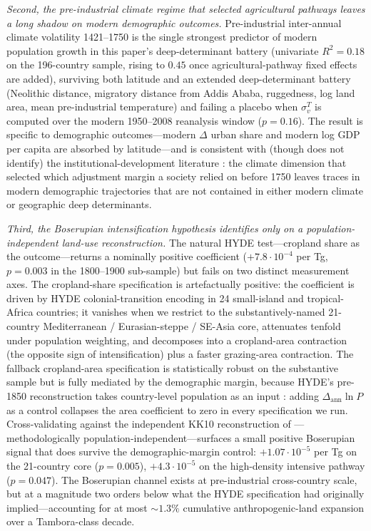 \documentclass[11pt,letterpaper]{article}
\begin{document}
\emph{Second, the pre-industrial climate regime that selected agricultural pathways leaves a long shadow on modern demographic outcomes.} Pre-industrial inter-annual climate volatility 1421--1750 is the single strongest predictor of modern population growth in this paper's deep-determinant battery (univariate $R^2 = 0.18$ on the 196-country sample, rising to $0.45$ once agricultural-pathway fixed effects are added), surviving both latitude and an extended deep-determinant battery (Neolithic distance, migratory distance from Addis Ababa, ruggedness, log land area, mean pre-industrial temperature) and failing a placebo when $\sigma_v^T$ is computed over the modern 1950--2008 reanalysis window ($p = 0.16$). The result is specific to demographic outcomes---modern $\Delta$ urban share and modern log GDP per capita are absorbed by latitude---and is consistent with (though does not identify) the institutional-development literature \citep{ashraf2013out, putterman2008, andersen2017climate}: the climate dimension that selected which adjustment margin a society relied on before 1750 leaves traces in modern demographic trajectories that are not contained in either modern climate or geographic deep determinants.

\emph{Third, the Boserupian intensification hypothesis identifies only on a population-independent land-use reconstruction.} The natural HYDE test---cropland share as the outcome---returns a nominally positive coefficient ($+7.8\!\cdot\!10^{-4}$ per Tg, $p=0.003$ in the 1800--1900 sub-sample) but fails on two distinct measurement axes. The cropland-share specification is artefactually positive: the coefficient is driven by HYDE colonial-transition encoding in 24 small-island and tropical-Africa countries; it vanishes when we restrict to the substantively-named 21-country Mediterranean / Eurasian-steppe / SE-Asia core, attenuates tenfold under population weighting, and decomposes into a cropland-area contraction (the opposite sign of intensification) plus a faster grazing-area contraction. The fallback cropland-area specification is statistically robust on the substantive sample but is fully mediated by the demographic margin, because HYDE's pre-1850 reconstruction takes country-level population as an input \citep{goldewijk2017, koch2019}: adding $\Delta_{\text{ann}} \ln P$ as a control collapses the area coefficient to zero in every specification we run. Cross-validating against the independent KK10 reconstruction of \citet{kaplan2011}---methodologically population-independent---surfaces a small positive Boserupian signal that does survive the demographic-margin control: $+1.07\!\cdot\!10^{-5}$ per Tg on the 21-country core ($p=0.005$), $+4.3\!\cdot\!10^{-5}$ on the high-density intensive pathway ($p=0.047$). The Boserupian channel exists at pre-industrial cross-country scale, but at a magnitude two orders below what the HYDE specification had originally implied---accounting for at most $\sim 1.3\%$ cumulative anthropogenic-land expansion over a Tambora-class decade.
\end{document}
